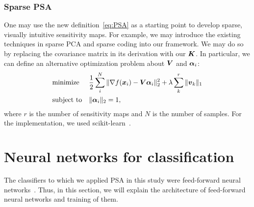 \subsubsection{Sparse PSA}
%
One may use the new definition~\eqref{eq:PSA} as a starting
point to develop sparse, visually intuitive sensitivity maps.
%
For example, we may introduce the existing techniques in sparse PCA and
sparse coding into our framework.
%
We may do so~\cite{Jenatton2009} by replacing the covariance matrix in
its derivation with our $\mbox{\boldmath $K$}$.
In particular, we can define an alternative optimization problem
about $\mbox{\boldmath $V$}$ and $\mbox{\boldmath $\alpha$}_i$:
%
\begin{align}
\begin{split}
 \begin{aligned}
& \text{minimize}
& & \frac{1}{2} \sum_{i}^{N} \| \nabla f(\mbox{\boldmath $x$}_i)
  - \mbox{\boldmath $V$} \mbox{\boldmath $\alpha$}_i \|_2^2 + \lambda \sum_{k}^{r}
  \|\mbox{\boldmath $v$}_k\|_1\\
& \text{subject to}
& & \|\mbox{\boldmath $\alpha$}_i\|_2 = 1,
 \end{aligned}
\end{split}
\label{eq:sparsePSA}
\end{align}
%
where $r$ is the number of sensitivity maps and $N$ is the number of samples.
For the implementation, we used scikit-learn~\cite{Pedregosa2012}.

\clearpage
\section{Neural networks for classification}
\label{sec:NN}
%
The classifiers to which we applied PSA in this study were feed-forward
neural networks~\cite{bishop2006pattern}.
Thus, in this section, we will explain the architecture of feed-forward neural
networks and training of them.

